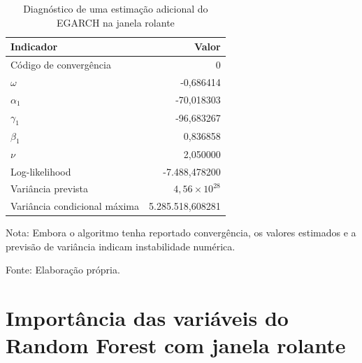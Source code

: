 \begin{table}[H]
    \centering
    \caption{Diagnóstico de uma estimação adicional do EGARCH na janela rolante}
    \label{tab:diagnostico_egarch_adicional}
    \small
    \begin{tabular}{lr}
        \toprule
        Indicador & Valor \\
        \midrule
        Código de convergência & 0 \\
        $\omega$ & -0,686414 \\
        $\alpha_1$ & -70,018303 \\
        $\gamma_1$ & -96,683267 \\
        $\beta_1$ & 0,836858 \\
        $\nu$ & 2,050000 \\
        Log-likelihood & -7.488,478200 \\
        Variância prevista & $4,56 \times 10^{28}$ \\
        Variância condicional máxima & 5.285.518,608281 \\
        \bottomrule
    \end{tabular}
    \begin{center}
        \footnotesize Nota: Embora o algoritmo tenha reportado convergência,
        os valores estimados e a previsão de variância indicam instabilidade numérica.

        \footnotesize Fonte: Elaboração própria.
    \end{center}
\end{table}

\section{Importância das variáveis do Random Forest com janela rolante}

